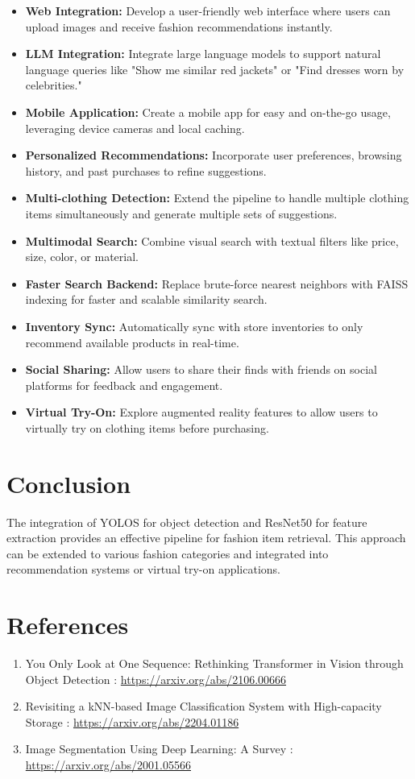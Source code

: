 \begin{itemize}
    \item \textbf{Web Integration:} Develop a user-friendly web interface where users can upload images and receive fashion recommendations instantly.
    \item \textbf{LLM Integration:} Integrate large language models to support natural language queries like "Show me similar red jackets" or "Find dresses worn by celebrities."
    \item \textbf{Mobile Application:} Create a mobile app for easy and on-the-go usage, leveraging device cameras and local caching.
    \item \textbf{Personalized Recommendations:} Incorporate user preferences, browsing history, and past purchases to refine suggestions.
    \item \textbf{Multi-clothing Detection:} Extend the pipeline to handle multiple clothing items simultaneously and generate multiple sets of suggestions.
    \item \textbf{Multimodal Search:} Combine visual search with textual filters like price, size, color, or material.
    \item \textbf{Faster Search Backend:} Replace brute-force nearest neighbors with FAISS indexing for faster and scalable similarity search.
    \item \textbf{Inventory Sync:} Automatically sync with store inventories to only recommend available products in real-time.
    \item \textbf{Social Sharing:} Allow users to share their finds with friends on social platforms for feedback and engagement.
    \item \textbf{Virtual Try-On:} Explore augmented reality features to allow users to virtually try on clothing items before purchasing.
\end{itemize}


\section*{Conclusion}
The integration of YOLOS for object detection and ResNet50 for feature extraction provides an effective pipeline for fashion item retrieval. This approach can be extended to various fashion categories and integrated into recommendation systems or virtual try-on applications.

\section*{References}
\begin{enumerate}
  \item You Only Look at One Sequence: Rethinking Transformer in Vision through Object Detection
  : \url{https://arxiv.org/abs/2106.00666}
  \item Revisiting a kNN-based Image Classification System with High-capacity Storage
  : \url{https://arxiv.org/abs/2204.01186}
  \item Image Segmentation Using Deep Learning: A Survey
  : \url{https://arxiv.org/abs/2001.05566}
\end{enumerate}